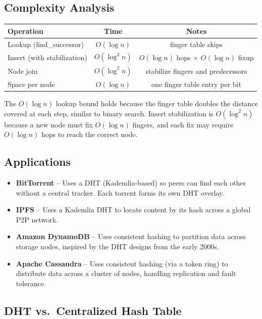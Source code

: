 \subsection{Complexity Analysis}

\begin{center}
\begin{tabular}{lcc}
\toprule
Operation & Time & Notes \\
\midrule
Lookup (find\_successor) & $O(\log n)$ & finger table skips \\
Insert (with stabilization) & $O(\log^2 n)$ & $O(\log n)$ hops $\times$ $O(\log n)$ fixup \\
Node join & $O(\log^2 n)$ & stabilize fingers and predecessors \\
Space per node & $O(\log n)$ & one finger table entry per bit \\
\bottomrule
\end{tabular}
\end{center}

The $O(\log n)$ lookup bound holds because the finger table doubles the distance covered at each step, similar to binary search. Insert stabilization is $O(\log^2 n)$ because a new node must fix $O(\log n)$ fingers, and each fix may require $O(\log n)$ hops to reach the correct node.

\subsection{Applications}

\begin{itemize}
    \item \textbf{BitTorrent} -- Uses a DHT (Kademlia-based) so peers can find each other without a central tracker. Each torrent forms its own DHT overlay.
    \item \textbf{IPFS} -- Uses a Kademlia DHT to locate content by its hash across a global P2P network.
    \item \textbf{Amazon DynamoDB} -- Uses consistent hashing to partition data across storage nodes, inspired by the DHT designs from the early 2000s.
    \item \textbf{Apache Cassandra} -- Uses consistent hashing (via a token ring) to distribute data across a cluster of nodes, handling replication and fault tolerance.
\end{itemize}

\subsection{DHT vs.\ Centralized Hash Table}

